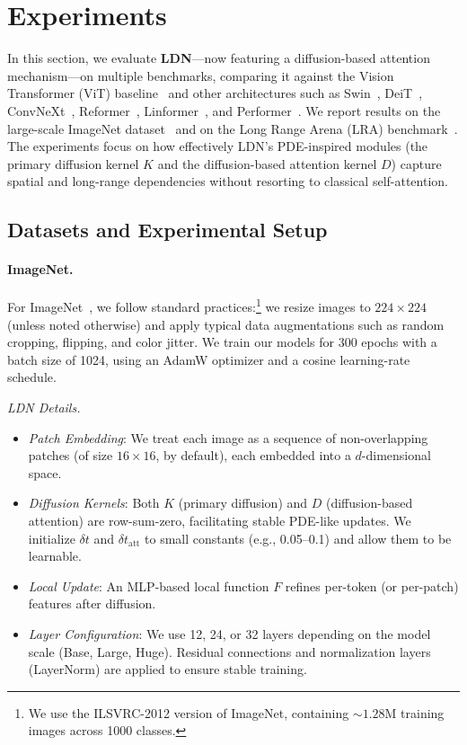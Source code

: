 \section{Experiments}
In this section, we evaluate \textbf{LDN}---now featuring a diffusion-based attention mechanism---on multiple benchmarks, comparing it against the Vision Transformer (ViT) baseline~\cite{dosovitskiy2020image} and other architectures such as Swin~\cite{liu2021swin}, DeiT~\cite{touvron2021training}, ConvNeXt~\cite{liu2022convnet}, Reformer~\cite{kitaev2020reformer}, Linformer~\cite{wang2020linformer}, and Performer~\cite{choromanski2020rethinking}. We report results on the large-scale ImageNet dataset~\cite{deng2009imagenet} and on the Long Range Arena (LRA) benchmark~\cite{tay2021long}. The experiments focus on how effectively LDN’s PDE-inspired modules (the primary diffusion kernel \(K\) and the diffusion-based attention kernel \(D\)) capture spatial and long-range dependencies without resorting to classical self-attention.

\subsection{Datasets and Experimental Setup}
\paragraph{ImageNet.} 
For ImageNet~\cite{deng2009imagenet}, we follow standard practices:\footnote{We use the ILSVRC-2012 version of ImageNet, containing \(\sim1.28\)M training images across 1000 classes.} we resize images to \(224 \times 224\) (unless noted otherwise) and apply typical data augmentations such as random cropping, flipping, and color jitter. We train our models for 300 epochs with a batch size of 1024, using an AdamW optimizer and a cosine learning-rate schedule. 

\textit{LDN Details.} 
\begin{itemize}
    \item \emph{Patch Embedding}: We treat each image as a sequence of non-overlapping patches (of size \(16 \times 16\), by default), each embedded into a \(d\)-dimensional space.
    \item \emph{Diffusion Kernels}: Both \(K\) (primary diffusion) and \(D\) (diffusion-based attention) are row-sum-zero, facilitating stable PDE-like updates. We initialize \(\delta t\) and \(\delta t_{\text{att}}\) to small constants (e.g., 0.05--0.1) and allow them to be learnable.
    \item \emph{Local Update}: An MLP-based local function \(F\) refines per-token (or per-patch) features after diffusion.
    \item \emph{Layer Configuration}: We use 12, 24, or 32 layers depending on the model scale (Base, Large, Huge). Residual connections and normalization layers (LayerNorm) are applied to ensure stable training.
\end{itemize}

